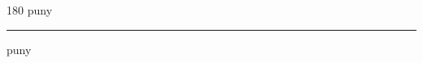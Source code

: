 
\begin{frame}
\begin{center}
\begin{turn}{180}
{\fontsize{2.5cm}{1em}\selectfont puny}
\end{turn}
\vspace{1em}\par  
\hrule
\vspace{1em}\par  
{\fontsize{2.5cm}{1em}\selectfont puny}
\end{center}
\end{frame}
